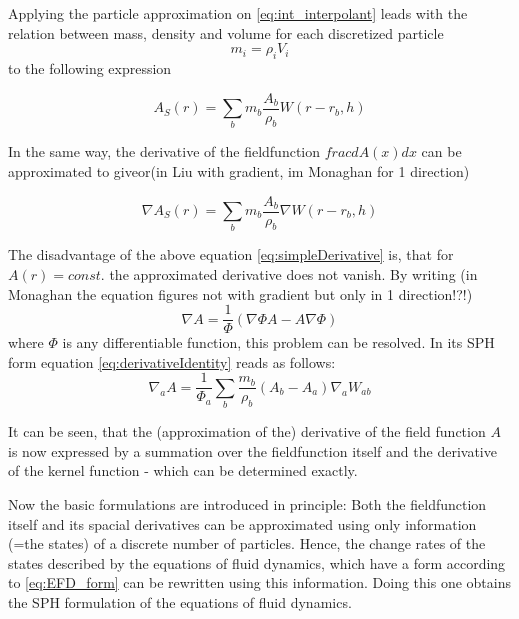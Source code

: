 \documentclass{report}
\begin{document}
Applying the particle approximation on \ref{eq:int_interpolant} leads with the
relation between mass, density and volume for each discretized particle
\begin{equation}
m_i=\rho_i V_i
\end{equation}
 to the following expression

\begin{equation}
\label{eq:intInter}
A_S(r)=\sum_b m_b \frac{A_b}{\rho_b}W(r-r_b,h)
\end{equation}


In the same way, the derivative of the fieldfunction $frac{dA(x)}{dx}$ can be
approximated to give\cite{Monaghan2005}or\cite{Liu2003}(in Liu with gradient,
im Monaghan for 1 direction)

\begin{equation}
\label{eq:simpleDerivative}
\nabla A_S(r)=\sum_b m_b \frac{A_b}{\rho_b}\nabla W(r-r_b,h)
\end{equation}

The disadvantage of the above equation \ref{eq:simpleDerivative} is, that for
$A(r)=const.$ the approximated derivative does not vanish. By writing (in
Monaghan the equation figures not with gradient but only in 1 direction!?!)
\begin{equation}
\label{eq:derivativeIdentity}
\nabla A = \frac{1}{\Phi}(\nabla {\Phi A}-A\nabla \Phi)
\end{equation}
where $\Phi$ is any differentiable function, this problem can be resolved. In its
SPH form  equation \ref{eq:derivativeIdentity} reads as follows:
\begin{equation}
\nabla_a A = \frac{1}{\Phi_a}\sum_b \frac{m_b}{\rho_b}(A_b-A_a)\nabla_a W_{ab}
\end{equation}


It can be seen, that the (approximation of the) derivative of the
field function $A$ is now expressed by a summation over the fieldfunction itself
and the derivative of the kernel function - which can be determined exactly.

Now the basic formulations are introduced in principle: Both the fieldfunction
itself and its spacial derivatives can be approximated using only information
(=the states) of a discrete number of particles. Hence, the change rates of
the states described by the equations of fluid dynamics, which have a form
according to \ref{eq:EFD_form} can be rewritten using this information. Doing
this one obtains the SPH formulation of the equations of fluid dynamics.
\end{document}

